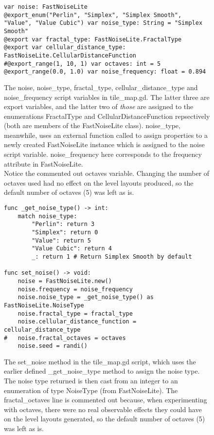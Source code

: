 \begin{figure}[H]
    \centering
    \begin{lstlisting}
var noise: FastNoiseLite
@export_enum("Perlin", "Simplex", "Simplex Smooth", "Value", "Value Cubic") var noise_type: String = "Simplex Smooth"
@export var fractal_type: FastNoiseLite.FractalType
@export var cellular_distance_type: FastNoiseLite.CellularDistanceFunction
#@export_range(1, 10, 1) var octaves: int = 5 
@export_range(0.0, 1.0) var noise_frequency: float = 0.894
    \end{lstlisting}
    \caption{The noise, noise\_type, fractal\_type, cellular\_distance\_type and noise\_frequency script variables in tile\_map.gd. The latter three are export variables, and the latter two of \textit{those} are assigned to the enumerations FractalType and CellularDistanceFunction repsectively (both are members of the FastNoiseLite class).\cite{fastnoiselitedocs} noise\_type, meanwhile, uses an external function called to assign properties to a newly created FastNoiseLite instance which is assigned to the noise script variable. noise\_frequency here corresponds to the frequency attribute in FastNoiseLite.\\Notice the commented out octaves variable. Changing the number of octaves used had no effect on the level layouts produced, so the default number of octaves (5) was left as is.}
    \label{fig:simplex1}
\end{figure}

\begin{figure}[H]
    \centering
    \begin{lstlisting}
func _get_noise_type() -> int:
	match noise_type:
		"Perlin": return 3
		"Simplex": return 0
		"Value": return 5
		"Value Cubic": return 4
		_: return 1 # Return Simplex Smooth by default

func set_noise() -> void:
	noise = FastNoiseLite.new()
	noise.frequency = noise_frequency
	noise.noise_type = _get_noise_type() as FastNoiseLite.NoiseType
	noise.fractal_type = fractal_type
	noise.cellular_distance_function = cellular_distance_type
#	noise.fractal_octaves = octaves
	noise.seed = randi()
    \end{lstlisting}
    \caption{The set\_noise method in the tile\_map.gd script, which uses the earlier defined \_get\_noise\_type method to assign the noise type. The noise type returned is then cast from an integer to an enumeration of type NoiseType (from FastNoiseLite). The fractal\_octaves line is commented out because, when experimenting with octaves, there were no real observable effects they could have on the level layouts generated, so the default number of octaves (5) was left as is.}
    \label{fig:simplex2}
\end{figure}

